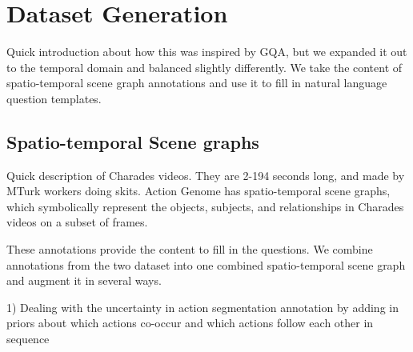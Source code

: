 \documentclass[10pt,twocolumn,letterpaper]{article}
\newcommand{\mgm}[1]{{\color{cyan}{mgm: #1}}}
\begin{document}


\section{Dataset Generation}

Quick introduction about how this was inspired by GQA, but we expanded it out to the temporal domain and balanced slightly differently. We take the content of spatio-temporal scene graph annotations and use it to fill in natural language question templates.

\subsection{Spatio-temporal Scene graphs}

Quick description of Charades videos. They are 2-194 seconds long, and made by MTurk workers doing skits. Action Genome has spatio-temporal scene graphs, which symbolically represent the objects, subjects, and relationships in Charades videos on a subset of frames. 

These annotations provide the content to fill in the questions. We combine annotations from the two dataset into one combined spatio-temporal scene graph and augment it in several ways. 

\mgm{Im not sure how many of these to include. Will think, and also will depend on space constraints. Some I can move down to supplementary}

1) Dealing with the uncertainty in action segmentation annotation by adding in priors about which actions co-occur and which actions follow each other in sequence
\end{document}
